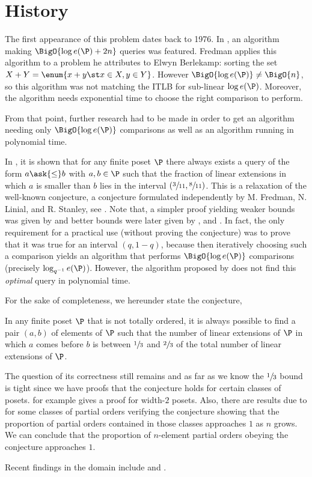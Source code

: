 \section{History}

The first appearance of this problem dates back to 1976. In
\citet*{fredman:1976}, an algorithm making $\BigO{\log e(\P) + 2n}$ queries was
featured. Fredman applies this algorithm to a problem he attributes to Elwyn
Berlekamp: sorting the set $X + Y = \enum{x + y \st x \in X, y \in Y}$. However
$\BigO{\log e(\P)} \neq \BigO{n}$, so this algorithm was not matching the ITLB
for sub-linear $\log e(\P)$. Moreover, the algorithm needs exponential time to
choose the right comparison to perform.

From that point, further research had to be made in order to get an algorithm
needing only $\BigO{\log e(\P)}$ comparisons as well as an algorithm running in
polynomial time.

In \citet*{kahn1984balancing}, it is shown that for any finite poset \(\P\)
there always exists a query of the form \(a \ask{\leq} b\) with \(a,b \in \P\)
such that the fraction of linear extensions in which $a$ is smaller than $b$
lies in the interval $(\sfrac{3}{11}, \sfrac{8}{11})$. This is a relaxation of
the well-known \onethirdtwothird conjecture, a conjecture formulated
independently by M. Fredman, N. Linial, and R. Stanley, see
\citet*{linial:1984}. Note that, a simpler proof yielding weaker
bounds was given by \citet*{kahn1991balancing} and better bounds were later
given by \citet*{brightwell1995balancing}, and \citet*{brightwell1999balanced}.
In fact, the only requirement for a practical use (without proving the
conjecture) was to prove that it was true for an interval $(q, 1-q)$, because
then iteratively choosing such a comparison yields an algorithm that performs
$\BigO{\log e(\P)}$ comparisons (precisely $\log_{q^{-1}} e(\P)$). However, the
algorithm proposed by \citet*{kahn1984balancing} does not find this
\emph{optimal} query in polynomial time.

For the sake of completeness, we hereunder state the \onethirdtwothird
conjecture,

\begin{conjecture}
In any finite poset $\P$ that is not totally ordered, it is always possible to
find a pair $(a,b)$ of elements of $\P$ such that the number of linear
extensions of $\P$ in which $a$ comes before $b$ is between $\sfrac{1}{3}$ and
$\sfrac{2}{3}$ of the total number of linear extensions of $\P$.
\end{conjecture}

The question of its correctness still remains and as far as we know the
$\sfrac{1}{3}$ bound is tight since we have proofs that the conjecture holds
for certain classes of posets. \citet*{linial:1984} for example gives a proof
for width-\(2\) posets. Also, there are results due to
\citet*{peczarski:2006} for some classes of partial orders verifying the
conjecture showing that the proportion of partial orders contained in those
classes approaches $1$ as $n$ grows. We can conclude that the proportion of
$n$-element partial orders obeying the \onethirdtwothird conjecture approaches
$1$.

Recent findings in the domain include \citet*{zaguia:2011} and
\citet*{peczarski:2008}.
